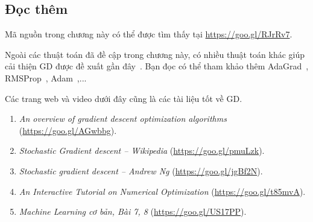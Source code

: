 





\subsection{Đọc thêm}

Mã nguồn trong chương này có thể được tìm thấy tại
\url{https://goo.gl/RJrRv7}.

Ngoài các thuật toán đã đề cập trong chương này, có nhiều thuật toán khác giúp
cải thiện GD được đề xuất gần đây~\cite{ruder2016overview}. Bạn
đọc có thể tham khảo thêm AdaGrad~\cite{duchi2011adaptive},
RMSProp~\cite{tieleman2012lecture}, Adam~\cite{kingma2014adam},...

Các trang web và video dưới đây cũng là các tài liệu tốt về GD.
\begin{enumerate}

\item \textit{An overview of gradient descent optimization algorithms}
(\url{https://goo.gl/AGwbbg}).

\item \textit{Stochastic Gradient descent -- Wikipedia}
(\url{https://goo.gl/pmuLzk}).

\item \textit{Stochastic gradient descent -- Andrew Ng} (\url{https://goo.gl/jgBf2N}).

\item  \textit{An Interactive Tutorial on Numerical Optimization}
(\url{https://goo.gl/t85mvA}).

\item \textit{Machine Learning cơ bản, Bài 7, 8} (\url{https://goo.gl/US17PP}).

\end{enumerate}
